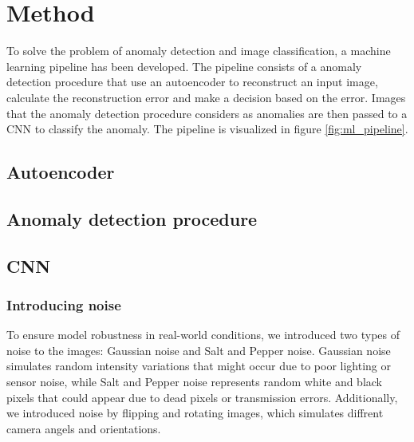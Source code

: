 \section{Method}

To solve the problem of anomaly detection and image classification, a machine learning pipeline has been developed. The pipeline consists of a anomaly detection procedure that use an autoencoder to reconstruct an input image, calculate the reconstruction error and make a decision based on the error. Images that the anomaly detection procedure considers as anomalies are then passed to a CNN to classify the anomaly. The pipeline is visualized in figure \ref{fig:ml_pipeline}.


\subsection{Autoencoder}

\subsection{Anomaly detection procedure}

\subsection{CNN}
\subsubsection{Introducing noise}
To ensure model robustness in real-world conditions, we introduced two types of noise to the images: Gaussian noise and Salt and Pepper noise. 
Gaussian noise simulates random intensity variations that might occur due to poor lighting or sensor noise, while Salt and Pepper noise represents random white and black pixels that could appear due to dead pixels or transmission errors.
Additionally, we introduced noise by flipping and rotating images, which simulates diffrent camera angels and orientations.

